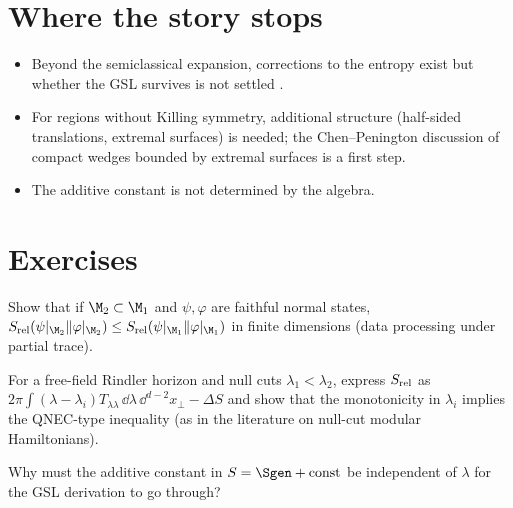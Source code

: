 \section{Where the story stops}

\begin{itemize}
\item Beyond the semiclassical expansion, corrections to the entropy exist but whether the GSL survives is not settled \cite{FaulknerSperanza2024}.
\item For regions without Killing symmetry, additional structure (half-sided translations, extremal surfaces) is needed; the Chen--Penington discussion of compact wedges bounded by extremal surfaces is a first step.
\item The additive constant is not determined by the algebra.
\end{itemize}

\section*{Exercises}
\begin{exercise}
Show that if $\M_2\subset\M_1$ and $\psi,\varphi$ are faithful normal states, $S_{\rm rel}(\psi|_{\M_2}\|\varphi|_{\M_2})\le S_{\rm rel}(\psi|_{\M_1}\|\varphi|_{\M_1})$ in finite dimensions (data processing under partial trace).
\end{exercise}
\begin{exercise}
For a free-field Rindler horizon and null cuts $\lambda_1<\lambda_2$, express $S_{\rm rel}$ as $2\pi\int(\lambda-\lambda_i)T_{\lambda\lambda}\,\dd\lambda\,\dd^{d-2}x_\perp-\Delta S$ and show that the monotonicity in $\lambda_i$ implies the QNEC-type inequality (as in the literature on null-cut modular Hamiltonians).
\end{exercise}
\begin{exercise}
Why must the additive constant in $S=\Sgen+\text{const}$ be independent of $\lambda$ for the GSL derivation to go through?
\end{exercise}
